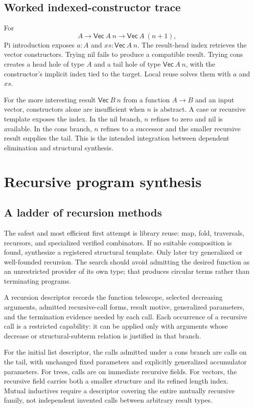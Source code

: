 \subsection{Worked indexed-constructor trace}
For
\[
  A\to\mathsf{Vec}\ A\ n\to\mathsf{Vec}\ A\ (n+1),
\]
Pi introduction exposes $a:A$ and $xs:\mathsf{Vec}\ A\ n$. The result-head index retrieves the vector constructors. Trying nil fails to produce a compatible result. Trying cons creates a head hole of type $A$ and a tail hole of type $\mathsf{Vec}\ A\ n$, with the constructor's implicit index tied to the target. Local reuse solves them with $a$ and $xs$.

For the more interesting result $\mathsf{Vec}\ B\ n$ from a function $A\to B$ and an input vector, constructors alone are insufficient when $n$ is abstract. A case or recursive template exposes the index. In the nil branch, $n$ refines to zero and nil is available. In the cons branch, $n$ refines to a successor and the smaller recursive result supplies the tail. This is the intended integration between dependent elimination and structural synthesis.

\section{Recursive program synthesis}
\label{sec:recursion}
\subsection{A ladder of recursion methods}
The safest and most efficient first attempt is library reuse: map, fold, traversals, recursors, and specialized verified combinators. If no suitable composition is found, synthesize a registered structural template. Only later try generalized or well-founded recursion. The search should avoid admitting the desired function as an unrestricted provider of its own type; that produces circular terms rather than terminating programs.

A recursion descriptor records the function telescope, selected decreasing arguments, admitted recursive-call forms, result motive, generalized parameters, and the termination evidence needed by each call. Each occurrence of a recursive call is a restricted capability: it can be applied only with arguments whose decrease or structural-subterm relation is justified in that branch.

For the initial list descriptor, the calls admitted under a cons branch are calls on the tail, with unchanged fixed parameters and explicitly generalized accumulator parameters. For trees, calls are on immediate recursive fields. For vectors, the recursive field carries both a smaller structure and its refined length index. Mutual inductives require a descriptor covering the entire mutually recursive family, not independent invented calls between arbitrary result types.

